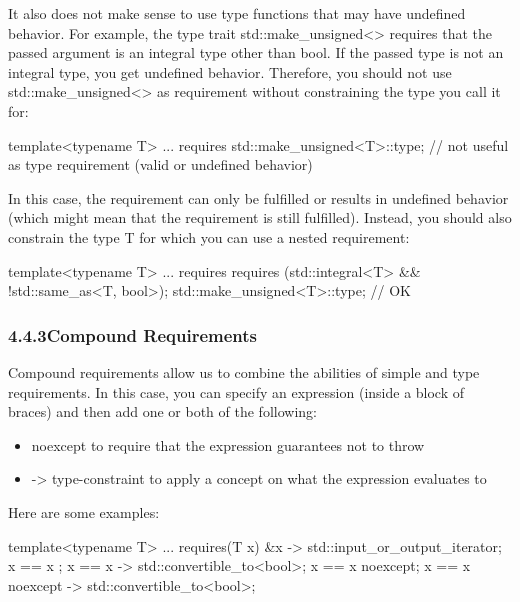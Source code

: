 It also does not make sense to use type functions that may have undefined behavior. For example, the type trait std::make\_unsigned<> requires that the passed argument is an integral type other than bool. If the passed type is not an integral type, you get undefined behavior. Therefore, you should not use std::make\_unsigned<> as requirement without constraining the type you call it for:

\begin{cpp}
template<typename T>
... requires {
	std::make_unsigned<T>::type; // not useful as type requirement (valid or undefined behavior)
}
\end{cpp}

In this case, the requirement can only be fulfilled or results in undefined behavior (which might mean that the requirement is still fulfilled). Instead, you should also constrain the type T for which you can use a nested requirement:

\begin{cpp}
template<typename T>
... requires {
	requires (std::integral<T> && !std::same_as<T, bool>);
	std::make_unsigned<T>::type; // OK
}
\end{cpp}


\subsubsection*{ 4.4.3\hspace{0.2cm}Compound Requirements}

Compound requirements allow us to combine the abilities of simple and type requirements. In this case, you can specify an expression (inside a block of braces) and then add one or both of the following:

\begin{itemize}
\item
noexcept to require that the expression guarantees not to throw

\item
-> type-constraint to apply a concept on what the expression evaluates to
\end{itemize}

Here are some examples:

\begin{cpp}
template<typename T>
... requires(T x) {
	{ &x } -> std::input_or_output_iterator;
	{ x == x };
	{ x == x } -> std::convertible_to<bool>;
	{ x == x }noexcept;
	{ x == x }noexcept -> std::convertible_to<bool>;
}
\end{cpp}

